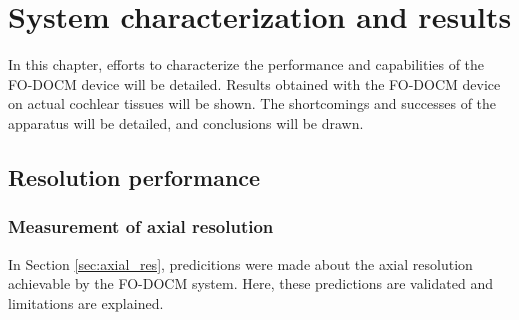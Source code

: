 \chapter{System characterization and results}

In this chapter, efforts to characterize the performance and capabilities of the FO-DOCM device will be detailed. Results obtained with the FO-DOCM device on actual cochlear tissues will be shown. The shortcomings and successes of the apparatus will be detailed, and conclusions will be drawn.

\section{Resolution performance}

\subsection{Measurement of axial resolution}

In Section \ref{sec:axial_res}, predicitions were made about the axial resolution achievable by the FO-DOCM system. Here, these predictions are validated and limitations are explained.





